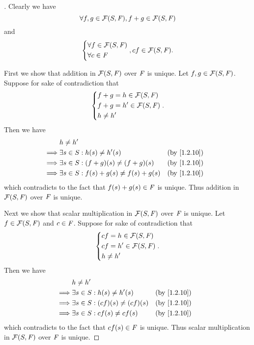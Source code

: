 \begin{proof}[]
	Clearly we have
	\[
		\forall f, g \in \FS, f + g \in \FS
	\]
	and
	\[
		\begin{dcases}
			\forall f \in \FS \\
			\forall c \in \F
		\end{dcases}, cf \in \FS.
	\]

	First we show that addition in \(\FS\) over \(\mathit{F}\) is unique.
	Let \(f, g \in \FS\).
	Suppose for sake of contradiction that
	\[
		\begin{dcases}
			f + g = h \in \FS  \\
			f + g = h' \in \FS \\
			h \neq h'
		\end{dcases}.
	\]
	Then we have
	\begin{align*}
		         & h \neq h'                                                                     \\
		\implies & \exists s \in S : h(s) \neq h'(s)              &  & \text{(by \cref{1.2.10})} \\
		\implies & \exists s \in S : (f + g)(s) \neq (f + g)(s)   &  & \text{(by \cref{1.2.10})} \\
		\implies & \exists s \in S : f(s) + g(s) \neq f(s) + g(s) &  & \text{(by \cref{1.2.10})}
	\end{align*}
	which contradicts to the fact that \(f(s) + g(s) \in \mathit{F}\) is unique.
	Thus addition in \(\FS\) over \(\mathit{F}\) is unique.

	Next we show that scalar multiplication in \(\FS\) over \(\mathit{F}\) is unique.
	Let \(f \in \FS\) and \(c \in \mathit{F}\).
	Suppose for sake of contradiction that
	\[
		\begin{dcases}
			cf = h \in \FS  \\
			cf = h' \in \FS \\
			h \neq h'
		\end{dcases}.
	\]
	Then we have
	\begin{align*}
		         & h \neq h'                                                             \\
		\implies & \exists s \in S : h(s) \neq h'(s)      &  & \text{(by \cref{1.2.10})} \\
		\implies & \exists s \in S : (cf)(s) \neq (cf)(s) &  & \text{(by \cref{1.2.10})} \\
		\implies & \exists s \in S : cf(s) \neq cf(s)     &  & \text{(by \cref{1.2.10})}
	\end{align*}
	which contradicts to the fact that \(cf(s) \in \mathit{F}\) is unique.
	Thus scalar multiplication in \(\FS\) over \(\mathit{F}\) is unique.


\end{proof}
